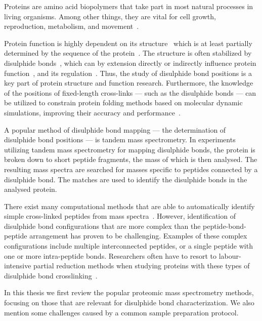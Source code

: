 
Proteins are amino acid biopolymers that take part in most natural processes in living organisms. Among other things, they are vital for cell growth, reproduction, metabolism, and movement~\cite{johnson1994sequential, prescott1968regulation, ketelaar2004actin, elston1998energy}.

Protein function is highly dependent on its structure~\cite{orengo1999protein} which is at least partially determined by the sequence of the protein~\cite{anfinsen1973principles}. The structure is often stabilized by disulphide bonds~\cite{wedemeyer2000disulfide, mcauley2008contributions}, which can by extension directly or indirectly influence protein function~\cite{nagahara2011intermolecular}, and its regulation~\cite{chiu2019allosteric}. Thus, the study of disulphide bond positions is a key part of protein structure and function research. Furthermore, the knowledge of the positions of fixed-length cross-links --- such as the disulphide bonds --- can be utilized to constrain protein folding methods based on molecular dynamic simulations, improving their accuracy and performance~\cite{brodie2017solving}.

A popular method of disulphide bond mapping --- the determination of disulphide bond positions --- is tandem mass spectrometry. In experiments utilizing tandem mass spectrometry for mapping disulphide bonds, the protein is broken down to short peptide fragments, the mass of which is then analysed. The resulting mass spectra are searched for masses specific to peptides connected by a disulphide bond. The matches are used to identify the disulphide bonds in the analysed protein.

There exist many computational methods that are able to automatically identify simple cross-linked peptides from mass spectra~\cite{lakbub2018recent, liu2014facilitating}. However, identification of disulphide bond configurations that are more complex than the peptide-bond-peptide arrangement has proven to be challenging. Examples of these complex configurations include multiple interconnected peptides, or a single peptide with one or more intra-peptide bonds. Researchers often have to resort to labour-intensive partial reduction methods when studying proteins with these types of disulphide bond crosslinking~\cite{wu1997novel, li2013disulfide}.

In this thesis we first review the popular proteomic mass spectrometry methods, focusing on those that are relevant for disulphide bond characterization. We also mention some challenges caused by a common sample preparation protocol.

